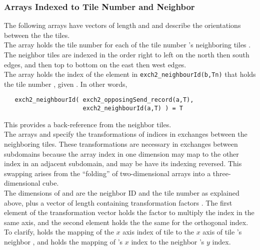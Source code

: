 \subsubsection{Arrays Indexed to Tile Number and Neighbor}

The following arrays have vectors of length  and
 and describe the orientations between the the tiles. \\

The array  holds the tile number
 for each of the tile number 's neighboring tiles
.  The neighbor tiles are indexed
 in the order right to left on the
north then south edges, and then top to bottom on the east then west
edges.  \\

 The  array holds the
index  of the element in \texttt{exch2\_neighbourId(b,Tn)}
that holds the tile number , given
.  In other words,
\begin{verbatim}
   exch2_neighbourId( exch2_opposingSend_record(a,T),
                      exch2_neighbourId(a,T) ) = T
\end{verbatim}
This provides a back-reference from the neighbor tiles. \\

The arrays  and
 specify the transformations of indices
in exchanges between the neighboring tiles.  These transformations are
necessary in exchanges between subdomains because the array index in
one dimension may map to the other index in an adjacent subdomain, and
may be have its indexing reversed. This swapping arises from the
``folding'' of two-dimensional arrays into a three-dimensional
cube. \\

The dimensions of  and 
are the neighbor ID  and the tile number  as explained
above, plus a vector of length  containing transformation
factors .  The first element of the transformation vector
holds the factor to multiply the index in the same axis, and the
second element holds the the same for the orthogonal index.  To
clarify,  holds the mapping of the $x$ axis
index of tile  to the $x$ axis of tile 's neighbor
, and  holds the mapping of 's
$x$ index to the neighbor 's $y$ index. \\
 

